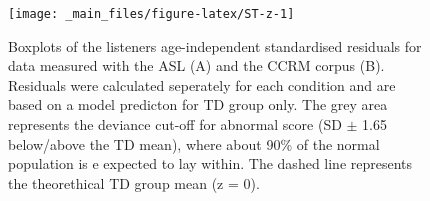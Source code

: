 \documentclass[a4paper, twoside]{templates/ociamthesis}
\begin{document}
\begin{figure}

{\centering \texttt{[image: \_main\_files/figure-latex/ST-z-1]} 

}

\caption{Boxplots of the listeners age-independent standardised residuals for data measured with the ASL (A) and the CCRM corpus (B). Residuals were calculated seperately for each condition and are based on a model predicton for TD group only. The grey area represents the deviance cut-off for abnormal score (SD $\pm$ 1.65 below/above the TD mean), where about 90\% of the normal population is e expected to lay within. The dashed line represents the theorethical TD group mean (z = 0).}\label{fig:ST-z}
\end{figure}

\begin{table}


\end{table}
\end{document}
